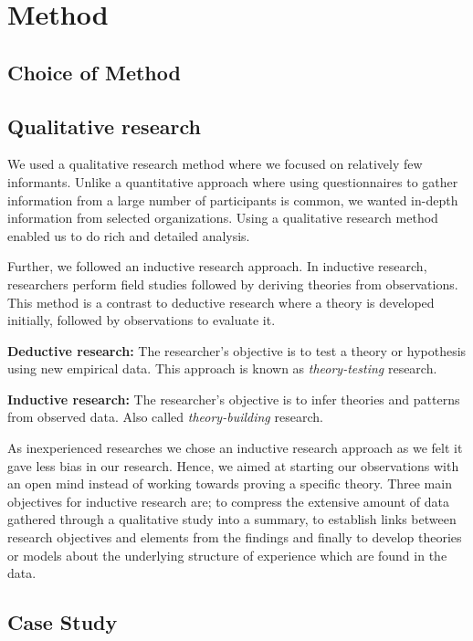 \chapter{Method}
\section{Choice of Method}


\section{Qualitative research}
We used a qualitative research method where we focused on relatively few informants. Unlike a quantitative approach where using questionnaires to gather information from a large number of participants is common, we wanted in-depth information from selected organizations. Using a qualitative research method enabled us to do rich and detailed analysis. 

Further, we followed an inductive research approach. In inductive research, researchers perform field studies followed by deriving theories from observations. This method is a contrast to deductive research where a theory is developed initially, followed by observations to evaluate it\cite{oates2005researching}. 

\textbf{Deductive research:} The researcher's objective is to test a theory or hypothesis using new empirical data. This approach is known as \emph{theory-testing} research\cite{bhattacherjee2012social}.

\textbf{Inductive research:} The researcher's objective is to infer theories and patterns from observed data. Also called \emph{theory-building} research\cite{bhattacherjee2012social}.

As inexperienced researches we chose an inductive research approach as we felt it gave less bias in our research. Hence, we aimed at starting our observations with an open mind instead of working towards proving a specific theory. Three main objectives for inductive research are; to compress the extensive amount of data gathered through a qualitative study into a summary, to establish links between research objectives and elements from the findings and finally to develop theories or models about the underlying structure of experience which are found in the data\cite{thomas2006general}.

\section{Case Study}
\label{sec:caseStudy}



